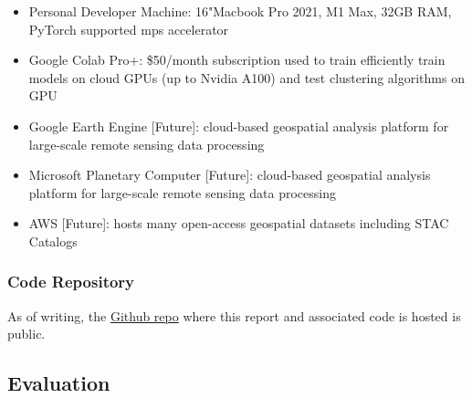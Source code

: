\begin{multicols}{2}
\begin{itemize}
    \item Personal Developer Machine: 16"Macbook Pro 2021, M1 Max, 32GB RAM, PyTorch supported mps accelerator
    \item Google Colab Pro+: \$50/month subscription used to train efficiently train models on cloud GPUs (up to Nvidia A100) and test clustering algorithms on GPU
    \item Google Earth Engine [Future]: cloud-based geospatial analysis platform for large-scale remote sensing data processing 
    \item Microsoft Planetary Computer [Future]: cloud-based geospatial analysis platform for large-scale remote sensing data processing
    \item AWS [Future]: hosts many open-access geospatial datasets including STAC Catalogs 
    
\end{itemize}

\subsubsection{Code Repository}

As of writing, the \href{https://github.com/avega17/CCOM_MS_Spring_2025_EO_PV_research}{Github repo} where this report and associated code is hosted is public.

\subsection{Evaluation}

\end{multicols}
